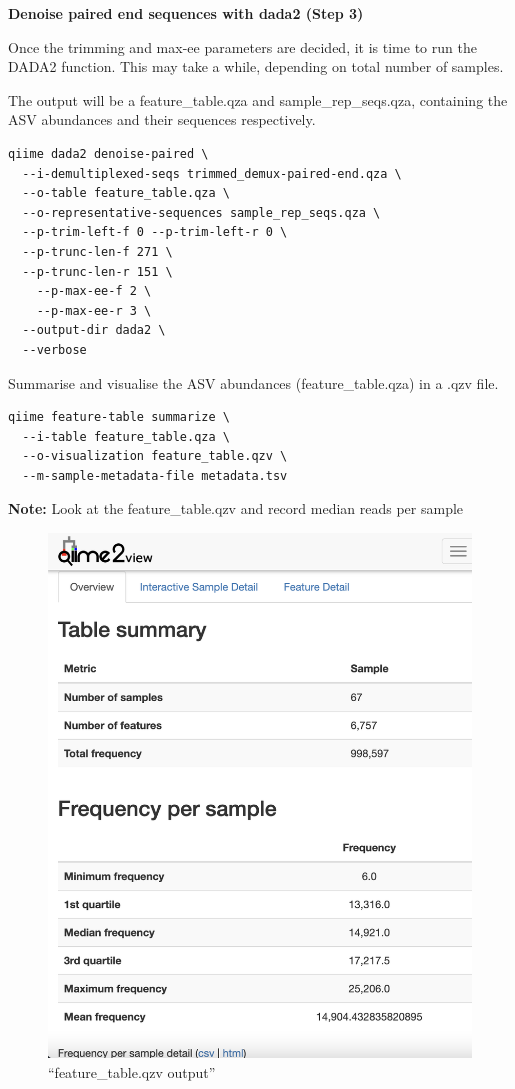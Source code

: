 \documentclass[
]{book}
\begin{document}
\hfill\break

\textbf{Denoise paired end sequences with dada2 (Step 3)}

Once the trimming and max-ee parameters are decided, it is time to run the DADA2 function. This may take a while, depending on total number of samples.

The output will be a feature\_table.qza and sample\_rep\_seqs.qza, containing the ASV abundances and their sequences respectively.

\begin{verbatim}
qiime dada2 denoise-paired \
  --i-demultiplexed-seqs trimmed_demux-paired-end.qza \
  --o-table feature_table.qza \
  --o-representative-sequences sample_rep_seqs.qza \
  --p-trim-left-f 0 --p-trim-left-r 0 \
  --p-trunc-len-f 271 \
  --p-trunc-len-r 151 \
    --p-max-ee-f 2 \
    --p-max-ee-r 3 \
  --output-dir dada2 \
  --verbose
\end{verbatim}

Summarise and visualise the ASV abundances (feature\_table.qza) in a .qzv file.

\begin{verbatim}
qiime feature-table summarize \
  --i-table feature_table.qza \
  --o-visualization feature_table.qzv \
  --m-sample-metadata-file metadata.tsv
\end{verbatim}

\textbf{Note:} Look at the feature\_table.qzv and record median reads per sample

\begin{figure}
\centering
\includegraphics{./img/feature-table.qzv.png}
\caption{``feature\_table.qzv output''}
\end{figure}
\end{document}
